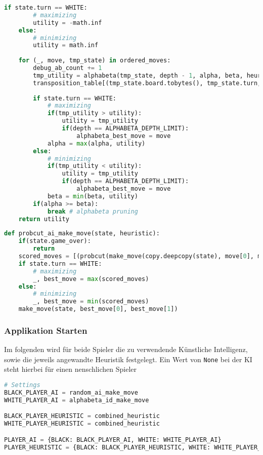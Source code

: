 \begin{lstlisting}[language=Python]
    if state.turn == WHITE:
        # maximizing
        utility = -math.inf
    else:
        # minimizing
        utility = math.inf
        
    for (_, move, tmp_state) in ordered_moves:
        debug_ab_count += 1
        tmp_utility = alphabeta(tmp_state, depth - 1, alpha, beta, heuristic)
        transposition_table[(tmp_state.board.tobytes(), tmp_state.turn, heuristic)] = tmp_utility
        
        if state.turn == WHITE:
            # maximizing
            if(tmp_utility > utility):
                utility = tmp_utility
                if(depth == ALPHABETA_DEPTH_LIMIT):
                    alphabeta_best_move = move
            alpha = max(alpha, utility)
        else:
            # minimizing
            if(tmp_utility < utility):
                utility = tmp_utility
                if(depth == ALPHABETA_DEPTH_LIMIT):
                    alphabeta_best_move = move
            beta = min(beta, utility)
        if(alpha >= beta):
            break # alphabeta pruning
    return utility
\end{lstlisting}

\begin{lstlisting}[language=Python]
def probcut_ai_make_move(state, heuristic):
    if(state.game_over):
        return
    scored_moves = [(probcut(make_move(copy.deepcopy(state), move[0], move[1]), PROBCUT_DEPTH-1, -1, 1, heuristic), move) for move in state.possible_moves]
    if state.turn == WHITE:
        # maximizing
        _, best_move = max(scored_moves)
    else:
        # minimizing
        _, best_move = min(scored_moves)
    make_move(state, best_move[0], best_move[1])
\end{lstlisting}

\hypertarget{applikation-starten}{%
\subsubsection{Applikation Starten}\label{applikation-starten}}

Im folgenden wird für beide Spieler die zu verwendende Künstliche
Intelligenz, sowie die jeweils angewandte Heuristik festgelegt. Ein Wert
von \passthrough{\lstinline!None!} bei der KI steht hierbei für einen
nenschlichen Spieler

\begin{lstlisting}[language=Python]
# Settings
BLACK_PLAYER_AI = random_ai_make_move
WHITE_PLAYER_AI = alphabeta_id_make_move

BLACK_PLAYER_HEURISTIC = combined_heuristic
WHITE_PLAYER_HEURISTIC = combined_heuristic

PLAYER_AI = {BLACK: BLACK_PLAYER_AI, WHITE: WHITE_PLAYER_AI}
PLAYER_HEURISTIC = {BLACK: BLACK_PLAYER_HEURISTIC, WHITE: WHITE_PLAYER_HEURISTIC}
\end{lstlisting}

